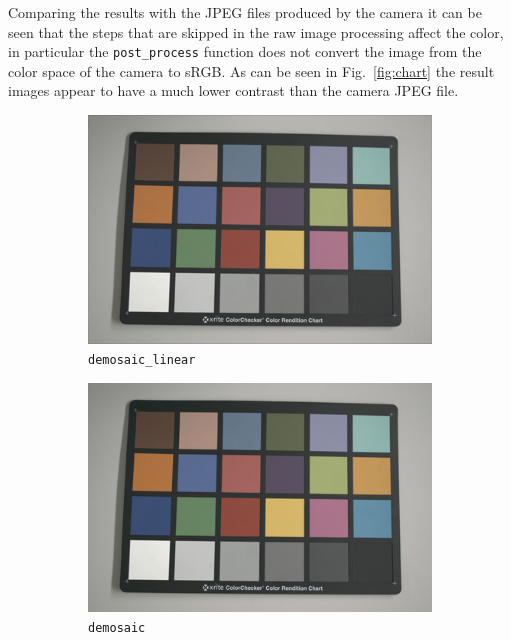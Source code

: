 \documentclass{article}
\newcommand{\inlinecode}[1]{\lstinline[basicstyle=\ttfamily,keywordstyle={}]{#1}}
\begin{document}
Comparing the results with the JPEG files produced by the camera it
can be seen that the steps that are skipped in the raw image processing
affect the color, in particular the \inlinecode{post_process} function
does not convert the image from the color space of the camera to
sRGB. As can be seen in Fig.~\ref{fig:chart} the result images appear
to have a much lower contrast than the camera JPEG file.
\begin{figure}[htbp]
  \centering
  \begin{subfigure}{.33\textwidth}
  \centering
  \includegraphics[width=.95\linewidth]{demosaic_macbeth_color_small}
  \caption{\inlinecode{demosaic_linear}}
\end{subfigure}%
\begin{subfigure}{.33\textwidth}
  \centering
  \includegraphics[width=.95\linewidth]{matlab_demosaic_macbeth_color_small}
  \caption{\inlinecode{demosaic}}
\end{subfigure}%
  \begin{subfigure}{.33\textwidth}

\end{subfigure}
\end{figure}
\end{document}
